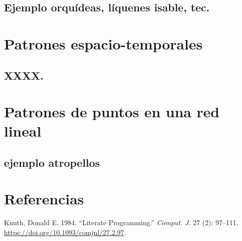 \documentclass[
  letterpaper,
  DIV=11,
  numbers=noendperiod]{scrreprt}
\newlength{\cslhangindent}
\newlength{\cslentryspacingunit} %
\newenvironment{CSLReferences}[2] %
 {%
  \setlength{\parindent}{0pt}
  \ifodd #1
  \let\oldpar\par
  \def\par{\hangindent=\cslhangindent\oldpar}
  \fi
  \setlength{\parskip}{#2\cslentryspacingunit}
 }%
 {}
\begin{document}
\hypertarget{ejemplo-orquuxeddeas-luxedquenes-isable-tec.}{%
\section{Ejemplo orquídeas, líquenes isable,
tec.}\label{ejemplo-orquuxeddeas-luxedquenes-isable-tec.}}


\hypertarget{patrones-espacio-temporales}{%
\chapter{Patrones
espacio-temporales}\label{patrones-espacio-temporales}}

\hypertarget{xxxx.}{%
\section{XXXX.}\label{xxxx.}}


\hypertarget{patrones-de-puntos-en-una-red-lineal}{%
\chapter{Patrones de puntos en una red
lineal}\label{patrones-de-puntos-en-una-red-lineal}}

\hypertarget{ejemplo-atropellos}{%
\section{ejemplo atropellos}\label{ejemplo-atropellos}}


\hypertarget{referencias}{%
\chapter*{Referencias}\label{referencias}}

\hypertarget{refs}{}
\begin{CSLReferences}{1}{0}
\leavevmode{}%
Knuth, Donald E. 1984. {``Literate Programming.''} \emph{Comput. J.} 27
(2): 97--111. \url{https://doi.org/10.1093/comjnl/27.2.97}.

\end{CSLReferences}
\end{document}

